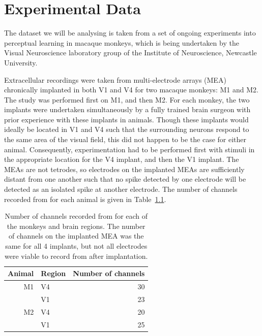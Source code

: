 \chapter{Experimental Data}
\label{ch:exp}

The dataset we will be analysing is taken from a set of ongoing experiments into perceptual learning in macaque monkeys, which is being undertaken by the Visual Neuroscience laboratory group of the Institute of Neuroscience, Newcastle University.

Extracellular recordings were taken from multi-electrode arrays (MEA) chronically implanted in both V1 and V4 for two macaque monkeys: M1 and M2. The study was performed first on M1, and then M2. For each monkey, the two implants were undertaken simultaneously by a fully trained brain surgeon with prior experience with these implants in animals. Though these implants would ideally be located in V1 and V4 such that the surrounding neurons respond to the same area of the visual field, this did not happen to be the case for either animal. Consequently, experimentation had to be performed first with stimuli in the appropriate location for the V4 implant, and then the V1 implant.
The MEAs are not tetrodes, so electrodes on the implanted MEAs are sufficiently distant from one another such that no spike detected by one electrode will be detected as an isolated spike at another electrode. The number of channels recorded from for each animal is given in Table~\ref{tab:nchannels}.

\begin{table}[hbtp]
\caption{\small{}Number of channels recorded from for each of the monkeys and brain regions. The number of channels on the implanted MEA was the same for all 4 implants, but not all electrodes were viable to record from after implantation.}
\label{tab:nchannels}
\begin{center}
\begin{tabular}{rlr}
\toprule
Animal  & Region & Number of channels
\\
\midrule
M1  & V4    & 30
\\
        & V1    & 23
\\
M2    & V4    & 20
\\
        & V1    & 25
\\
\bottomrule
\end{tabular}
\end{center}
\end{table}

